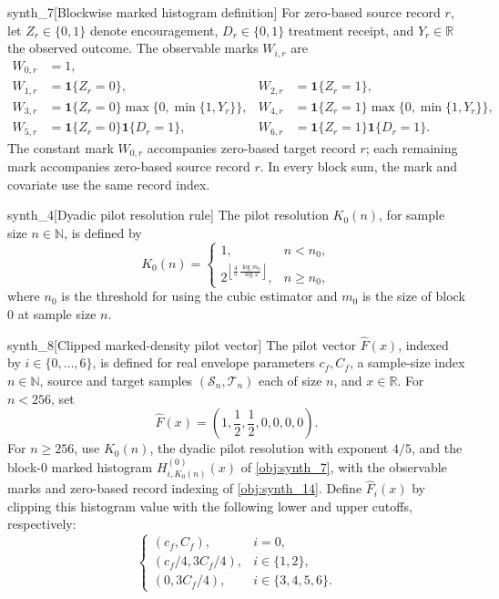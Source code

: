 \begin{definitionv}{synth_7}[Blockwise marked histogram definition]
For zero-based source record \(r\), let \(Z_r\in\{0,1\}\) denote encouragement, \(D_r\in\{0,1\}\) treatment receipt, and \(Y_r\in\mathbb R\) the observed outcome. The observable marks \(W_{i,r}\) are
\[
\begin{aligned}
W_{0,r}&=1,\\
W_{1,r}&=\mathbf 1\{Z_r=0\},
&
W_{2,r}&=\mathbf 1\{Z_r=1\},\\
W_{3,r}&=\mathbf 1\{Z_r=0\}\max\{0,\min\{1,Y_r\}\},
&
W_{4,r}&=\mathbf 1\{Z_r=1\}\max\{0,\min\{1,Y_r\}\},\\
W_{5,r}&=\mathbf 1\{Z_r=0\}\mathbf 1\{D_r=1\},
&
W_{6,r}&=\mathbf 1\{Z_r=1\}\mathbf 1\{D_r=1\}.
\end{aligned}
\]
The constant mark \(W_{0,r}\) accompanies zero-based target record \(r\); each remaining mark accompanies zero-based source record \(r\). In every block sum, the mark and covariate use the same record index.
\end{definitionv}

\begin{definitionv}{synth_4}[Dyadic pilot resolution rule]
The pilot resolution \(K_0(n)\), for sample size \(n\in\mathbb N\), is defined by
\[
K_0(n)=
\begin{cases}
1, & n<n_0,\\[2pt]
2^{\left\lfloor \frac45\,\frac{\log m_0}{\log 2}\right\rfloor},
& n\ge n_0,
\end{cases}
\]
where \(n_0\) is the threshold for using the cubic estimator and \(m_0\) is the size of block \(0\) at sample size \(n\).
\end{definitionv}

\begin{definitionv}{synth_8}[Clipped marked-density pilot vector]
The pilot vector \(\widehat F(x)\), indexed by \(i\in\{0,\ldots,6\}\), is defined for real envelope parameters \(c_f,C_f\), a sample-size index \(n\in\mathbb N\), source and target samples \((\mathcal S_n,\mathcal T_n)\) each of size \(n\), and \(x\in\mathbb R\). For \(n<256\), set
\[
\widehat F(x)=\left(1,\frac12,\frac12,0,0,0,0\right).
\]
For \(n\ge256\), use \(K_0(n)\), the dyadic pilot resolution with exponent \(4/5\), and the block-\(0\) marked histogram \(H_{i,K_0(n)}^{(0)}(x)\) of \cref{obj:synth_7}, with the observable marks and zero-based record indexing of \cref{obj:synth_14}. Define \(\widehat F_i(x)\) by clipping this histogram value with the following lower and upper cutoffs, respectively:
\[
\begin{cases}
(c_f,C_f), & i=0,\\
(c_f/4,3C_f/4), & i\in\{1,2\},\\
(0,3C_f/4), & i\in\{3,4,5,6\}.
\end{cases}
\]
\end{definitionv}

